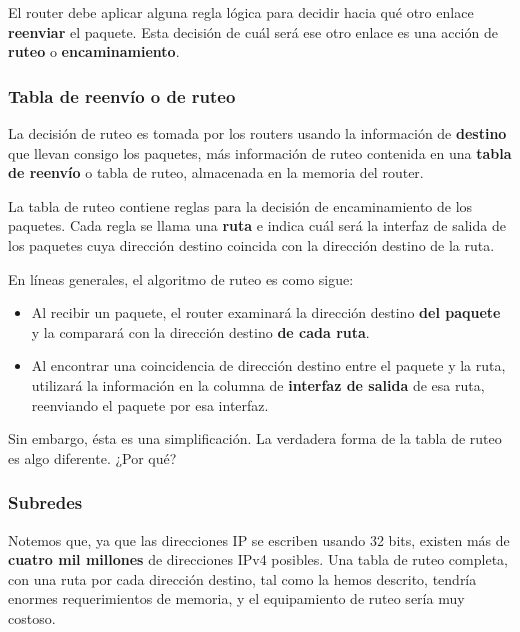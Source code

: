 \documentclass[spanish,A4,]{article}
\begin{document}
El router debe aplicar alguna regla lógica para decidir hacia qué otro
enlace \textbf{reenviar} el paquete. Esta decisión de cuál será ese otro
enlace es una acción de \textbf{ruteo} o \textbf{encaminamiento}.

\subsubsection{Tabla de reenvío o de
ruteo}\label{tabla-de-reenvuxedo-o-de-ruteo}

La decisión de ruteo es tomada por los routers usando la información de
\textbf{destino} que llevan consigo los paquetes, más información de
ruteo contenida en una \textbf{tabla de reenvío} o tabla de ruteo,
almacenada en la memoria del router.

La tabla de ruteo contiene reglas para la decisión de encaminamiento de
los paquetes. Cada regla se llama una \textbf{ruta} e indica cuál será
la interfaz de salida de los paquetes cuya dirección destino coincida
con la dirección destino de la ruta.

En líneas generales, el algoritmo de ruteo es como sigue:

\begin{itemize}
\itemsep1pt\parskip0pt
\item
  Al recibir un paquete, el router examinará la dirección destino
  \textbf{del paquete} y la comparará con la dirección destino
  \textbf{de cada ruta}.
\item
  Al encontrar una coincidencia de dirección destino entre el paquete y
  la ruta, utilizará la información en la columna de \textbf{interfaz de
  salida} de esa ruta, reenviando el paquete por esa interfaz.
\end{itemize}

Sin embargo, ésta es una simplificación. La verdadera forma de la tabla
de ruteo es algo diferente. ¿Por qué?

\subsubsection{Subredes}\label{subredes}

Notemos que, ya que las direcciones IP se escriben usando 32 bits,
existen más de \textbf{cuatro mil millones} de direcciones IPv4
posibles. Una tabla de ruteo completa, con una ruta por cada dirección
destino, tal como la hemos descrito, tendría enormes requerimientos de
memoria, y el equipamiento de ruteo sería muy costoso.
\end{document}
